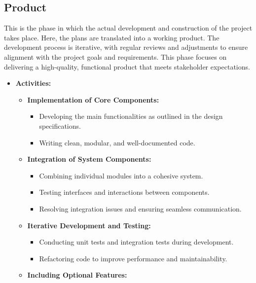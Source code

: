 \documentclass{article}
\begin{document}
\subsection{Product}
This is the phase in which the actual development and construction of the project takes place. Here, the plans are translated into a working product. The development process is iterative, with regular reviews and adjustments to ensure alignment with the project goals and requirements. This phase focuses on delivering a high-quality, functional product that meets stakeholder expectations.

\begin{itemize}[leftmargin=*, label={}]
    \item \textbf{Activities:}
        \begin{itemize}
            \item \textbf{Implementation of Core Components:}
                \begin{itemize}
                    \item Developing the main functionalities as outlined in the design specifications.
                    \item Writing clean, modular, and well-documented code.
                \end{itemize}
            \item \textbf{Integration of System Components:}
                \begin{itemize}
                    \item Combining individual modules into a cohesive system.
                    \item Testing interfaces and interactions between components.
                    \item Resolving integration issues and ensuring seamless communication.
                \end{itemize}
            \item \textbf{Iterative Development and Testing:}
                \begin{itemize}
                    \item Conducting unit tests and integration tests during development.
                    \item Refactoring code to improve performance and maintainability.
                \end{itemize}
            \item \textbf{Including Optional Features:}
                \begin{itemize}

\end{itemize}
\end{itemize}
\end{itemize}
\end{document}
